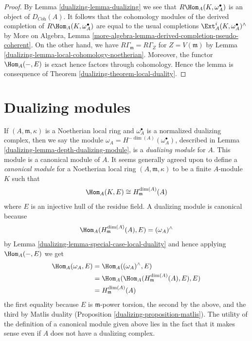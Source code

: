 \begin{proof}

By Lemma \ref{dualizing-lemma-dualizing} we see that $R\Hom_A(K, \omega_A^\bullet)$
is an object of $D_{\textit{Coh}}(A)$.
It follows that the cohomology modules of the derived completion
of $R\Hom_A(K, \omega_A^\bullet)$ are equal to the usual completions
$\Ext^i_A(K, \omega_A^\bullet)^\wedge$ by
More on Algebra, Lemma
\ref{more-algebra-lemma-derived-completion-pseudo-coherent}.
On the other hand, we have $R\Gamma_{\mathfrak m} = R\Gamma_Z$
for $Z = V(\mathfrak m)$ by Lemma \ref{dualizing-lemma-local-cohomology-noetherian}.
Moreover, the functor $\Hom_A(-, E)$ is exact hence
factors through cohomology.
Hence the lemma is consequence of
Theorem \ref{dualizing-theorem-local-duality}.
\end{proof}

\section{Dualizing modules}
\label{dualizing-section-dualizing-module}
If $(A, \mathfrak m, \kappa)$ is a Noetherian local ring and
$\omega_A^\bullet$ is a normalized dualizing complex, then
we say the module $\omega_A = H^{-\dim(A)}(\omega_A^\bullet)$, described
in Lemma \ref{dualizing-lemma-depth-dualizing-module},
is a {\it dualizing module}
for $A$. This module is a canonical module of $A$.
It seems generally agreed upon to define a {\it canonical module}
for a Noetherian local ring $(A, \mathfrak m, \kappa)$ to be
a finite $A$-module $K$ such that
$$
\Hom_A(K, E) \cong H^{\dim(A)}_\mathfrak m(A)
$$
where $E$ is an injective hull of the residue field. A dualizing
module is canonical because
$$
\Hom_A(H^{\dim(A)}_\mathfrak m(A), E) = (\omega_A)^\wedge
$$
by Lemma \ref{dualizing-lemma-special-case-local-duality}
and hence applying
$\Hom_A(-, E)$ we get
\begin{align*}
\Hom_A(\omega_A, E)
& =
\Hom_A((\omega_A)^\wedge, E) \\
& =
\Hom_A(\Hom_A(H^{\dim(A)}_\mathfrak m(A), E), E) \\
& = H^{\dim(A)}_\mathfrak m(A)
\end{align*}
the first equality because $E$ is $\mathfrak m$-power torsion, the
second by the above, and the third by Matlis duality
(Proposition \ref{dualizing-proposition-matlis}).
The utility of the definition
of a canonical module given above lies in the fact that it makes sense
even if $A$ does not have a dualizing complex.

